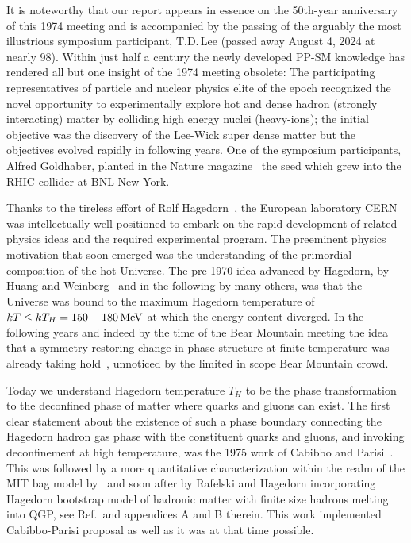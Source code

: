 It is noteworthy that our report appears in essence on the 50th-year anniversary of this 1974 meeting and is accompanied by the passing of the arguably the most illustrious symposium participant, T.D.\,Lee (passed away August 4, 2024 at nearly 98). Within just half a century the newly developed PP-SM knowledge has rendered all but one insight of the 1974 meeting obsolete: The participating representatives of particle and nuclear physics elite of the epoch recognized the novel opportunity to experimentally explore hot and dense hadron (strongly interacting) matter by colliding high energy nuclei (heavy-ions); the initial objective was the discovery of the Lee-Wick super dense matter but the objectives evolved rapidly in following years. One of the symposium participants, Alfred Goldhaber, planted in the Nature magazine~\cite{Goldhaber:1978qp} the seed which grew into the RHIC collider at BNL-New York. 

 Thanks to the tireless effort of Rolf Hagedorn~\cite{Rafelski:2016hnq}, the European laboratory CERN was intellectually well positioned to embark on the rapid development of related physics ideas and the required experimental program. The preeminent physics motivation that soon emerged was the understanding of the primordial composition of the hot Universe. The pre-1970 idea advanced by Hagedorn, by Huang and Weinberg~\cite{Huang:1970iq} and in the following by many others, was that the Universe was bound to the maximum Hagedorn temperature of $kT\le kT_H=150-180\text{\,MeV}$ at which the energy content diverged. In the following years and indeed by the time of the Bear Mountain meeting the idea that a symmetry restoring change in phase structure at finite temperature was already taking hold~\cite{Weinberg:1974hy,Harrington:1974fc}, unnoticed by the limited in scope Bear Mountain crowd.

Today we understand Hagedorn temperature $T_H$ to be the phase transformation to the deconfined phase of matter where quarks and gluons can exist. The first clear statement about the existence of such a phase boundary connecting the Hagedorn hadron gas phase with the constituent quarks and gluons, and invoking deconfinement at high temperature, was the 1975 work of Cabibbo and Parisi~\cite{Cabibbo:1975ig}. This was followed by a more quantitative characterization within the realm of the MIT bag model by~\cite{Chin:1978gj} and soon after by Rafelski and Hagedorn incorporating Hagedorn bootstrap model of hadronic matter with finite size hadrons melting into QGP, see Ref.\,\cite{Rafelski:2015cxa} and appendices A and B therein. This work implemented Cabibbo-Parisi proposal as well as it was at that time possible.

